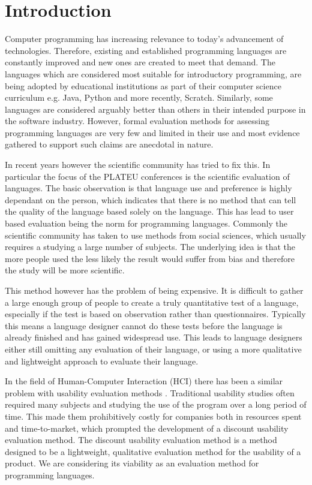 \chapter{Introduction}
\label{chap:introduction}

Computer programming has increasing relevance to today's advancement of technologies. Therefore, existing and established programming languages are constantly improved and new ones are created to meet that demand. The languages which are considered most suitable for introductory programming, are being adopted by educational institutions as part of their computer science curriculum e.g. Java, Python and more recently, Scratch\cite{PracticeTeachingIntro}. Similarly, some languages are considered arguably better than others in their intended purpose in the software industry. However, formal evaluation methods for assessing programming languages are very few and limited in their use and most evidence gathered to support such claims are anecdotal in nature\cite{StakingClaims}. 

In recent years however the scientific community has tried to fix this.
In particular the focus of the PLATEU conferences is the scientific evaluation of languages.
The basic observation is that language use and preference is highly dependant on the person, which indicates that there is no method that can tell the quality of the language based solely on the language.
This has lead to user based evaluation being the norm for programming languages.
Commonly the scientific community has taken to use methods from social sciences, which usually requires a studying a large number of subjects\cite{SocioPLT}\cite{AliceCS1}\cite{BlockOrNot}\cite{FromScratch}.
The underlying idea is that the more people used the less likely the result would suffer from bias and therefore the study will be more scientific.

This method however has the problem of being expensive.
It is difficult to gather a large enough group of people to create a truly quantitative test of a language, especially if the test is based on observation rather than questionnaires.
Typically this means a language designer cannot do these tests before the language is already finished and has gained widespread use.
This leads to language designers either still omitting any evaluation of their language, or using a more qualitative and lightweight approach to evaluate their language.

In the field of Human-Computer Interaction (HCI) there has been a similar problem with usability evaluation methods \cite{IDA}.
Traditional usability studies often required many subjects and studying the use of the program over a long period of time.
This made them prohibitively costly for companies both in resources spent and time-to-market, which prompted the development of a discount usability evaluation method\cite{AndrewMonk}.%
The discount usability evaluation method is a method designed to be a lightweight, qualitative evaluation method for the usability of a product.
We are considering its viability as an evaluation method for programming languages.

